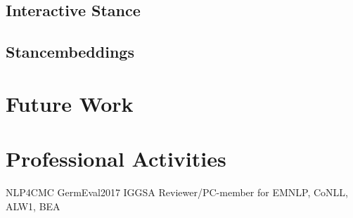 \documentclass[11pt]{article}
\begin{document}
\subsection{Interactive Stance}
\subsection{Stancembeddings}

\section{Future Work}

\section{Professional Activities}
NLP4CMC
GermEval2017
IGGSA
Reviewer/PC-member for EMNLP, CoNLL, ALW1, BEA



%
%


\end{document}
